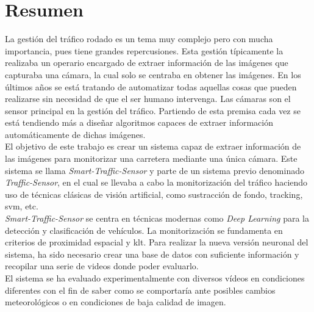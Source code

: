 \chapter*{Resumen}

La gestión del tráfico rodado es un tema muy complejo pero con mucha importancia, pues tiene grandes repercusiones. Esta gestión típicamente la realizaba un operario encargado de extraer información de las imágenes que capturaba una cámara, la cual solo se centraba en obtener las imágenes. En los últimos años se está tratando de automatizar todas aquellas cosas que pueden realizarse sin necesidad de que el ser humano intervenga. Las cámaras son el sensor principal en la gestión del tráfico. Partiendo de esta premisa cada  vez se está tendiendo más a diseñar algoritmos capaces de extraer información automáticamente de dichas imágenes.\\

El objetivo de este trabajo es crear un sistema capaz de extraer información de las imágenes para monitorizar una carretera mediante una única cámara. Este sistema se llama \textit{Smart-Traffic-Sensor} y parte de un sistema previo denominado \textit{Traffic-Sensor}, en el cual se llevaba a cabo la monitorización del tráfico haciendo uso de técnicas clásicas de visión artificial, como sustracción de fondo, tracking, \acrshort{svm}, etc.\\

\textit{Smart-Traffic-Sensor} se centra en técnicas modernas como \textit{Deep Learning} para la detección y clasificación de vehículos. La monitorización se fundamenta en criterios  de  proximidad  espacial  y \acrfull{klt}. Para realizar la nueva versión neuronal del sistema, ha sido necesario crear una base de datos con suficiente información y recopilar una serie de videos donde poder evaluarlo.\\

El sistema se ha evaluado experimentalmente con diversos vídeos en condiciones diferentes con el fin de saber como se comportaría ante posibles cambios meteorológicos o en condiciones de baja calidad de imagen.




